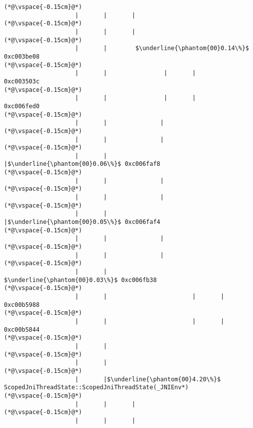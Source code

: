 \begin{lstlisting}[caption=Unicode-merkkijonon kopiointi C$\to$Java, label=profile:C2JCopyUnicode-512, numberbychapter=true, frame=lines, float, floatplacement=t]
(*@\vspace{-0.15cm}@*)
                    |       |       |
(*@\vspace{-0.15cm}@*)
                    |       |       |
(*@\vspace{-0.15cm}@*)
                    |       |        $\underline{\phantom{00}0.14\%}$ 0xc003be08
(*@\vspace{-0.15cm}@*)
                    |       |                |       |               0xc003503c
(*@\vspace{-0.15cm}@*)
                    |       |                |       |               0xc006fed0
(*@\vspace{-0.15cm}@*)
                    |       |               |
(*@\vspace{-0.15cm}@*)
                    |       |               |
(*@\vspace{-0.15cm}@*)
                    |       |               |$\underline{\phantom{00}0.06\%}$ 0xc006faf8
(*@\vspace{-0.15cm}@*)
                    |       |               |
(*@\vspace{-0.15cm}@*)
                    |       |               |
(*@\vspace{-0.15cm}@*)
                    |       |               |$\underline{\phantom{00}0.05\%}$ 0xc006faf4
(*@\vspace{-0.15cm}@*)
                    |       |               |
(*@\vspace{-0.15cm}@*)
                    |       |               |
(*@\vspace{-0.15cm}@*)
                    |       |                $\underline{\phantom{00}0.03\%}$ 0xc006fb38
(*@\vspace{-0.15cm}@*)
                    |       |                        |       |                       0xc00b5988
(*@\vspace{-0.15cm}@*)
                    |       |                        |       |                       0xc00b5844
(*@\vspace{-0.15cm}@*)
                    |       |
(*@\vspace{-0.15cm}@*)
                    |       |
(*@\vspace{-0.15cm}@*)
                    |       |$\underline{\phantom{00}4.20\%}$ ScopedJniThreadState::ScopedJniThreadState(_JNIEnv*)
(*@\vspace{-0.15cm}@*)
                    |       |       |
(*@\vspace{-0.15cm}@*)
                    |       |       |

\end{lstlisting}
